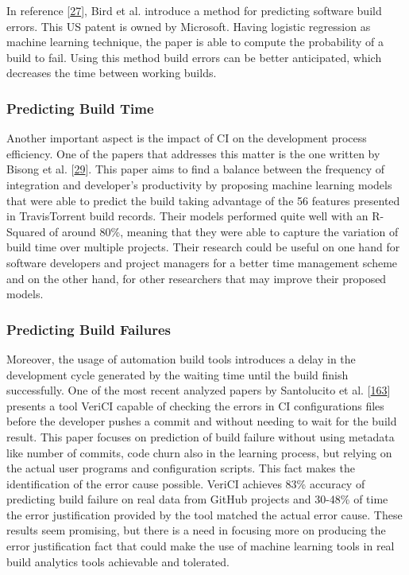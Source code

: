 \documentclass[]{book}
\begin{document}
In reference {[}\protect\hyperlink{ref-bird2017predicting}{27}{]}, Bird
et al. introduce a method for predicting software build errors. This US
patent is owned by Microsoft. Having logistic regression as machine
learning technique, the paper is able to compute the probability of a
build to fail. Using this method build errors can be better anticipated,
which decreases the time between working builds.

\subsubsection{Predicting Build Time}\label{predicting-build-time}

Another important aspect is the impact of CI on the development process
efficiency. One of the papers that addresses this matter is the one
written by Bisong et al.
{[}\protect\hyperlink{ref-bisong2017built}{29}{]}. This paper aims to
find a balance between the frequency of integration and developer's
productivity by proposing machine learning models that were able to
predict the build taking advantage of the 56 features presented in
TravisTorrent build records. Their models performed quite well with an
R-Squared of around 80\%, meaning that they were able to capture the
variation of build time over multiple projects. Their research could be
useful on one hand for software developers and project managers for a
better time management scheme and on the other hand, for other
researchers that may improve their proposed models.

\subsubsection{Predicting Build
Failures}\label{predicting-build-failures}

Moreover, the usage of automation build tools introduces a delay in the
development cycle generated by the waiting time until the build finish
successfully. One of the most recent analyzed papers by Santolucito et
al. {[}\protect\hyperlink{ref-santolucito2018statically}{163}{]}
presents a tool VeriCI capable of checking the errors in CI
configurations files before the developer pushes a commit and without
needing to wait for the build result. This paper focuses on prediction
of build failure without using metadata like number of commits, code
churn also in the learning process, but relying on the actual user
programs and configuration scripts. This fact makes the identification
of the error cause possible. VeriCI achieves 83\% accuracy of predicting
build failure on real data from GitHub projects and 30-48\% of time the
error justification provided by the tool matched the actual error cause.
These results seem promising, but there is a need in focusing more on
producing the error justification fact that could make the use of
machine learning tools in real build analytics tools achievable and
tolerated.
\end{document}
